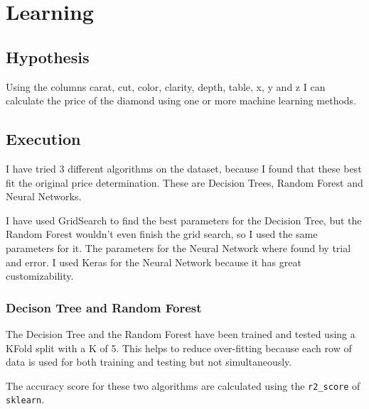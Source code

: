 \documentclass{scrreprt}
\begin{document}
	\chapter{Learning}
		\section{Hypothesis}
			Using the columns carat, cut, color, clarity, depth, table, x, y and z I can calculate the price of the diamond using one or more machine learning methods.\par
		\section{Execution}
			I have tried 3 different algorithms on the dataset, because I found that these best fit the original price determination. These are Decision Trees, Random Forest and Neural Networks. \par
			I have used GridSearch to find the best parameters for the Decision Tree, but the Random Forest wouldn't even finish the grid search, so I used the same parameters for it. The parameters for the Neural Network where found by trial and error. I used Keras for the Neural Network because it has great customizability.\par
			\subsection{Decison Tree and Random Forest}
				The Decision Tree and the Random Forest have been trained and tested using a KFold split with a K of 5. This helps to reduce over-fitting because each row of data is used for both training and testing but not simultaneously.\par
				The accuracy score for these two algorithms are calculated using the \texttt{r2\_score} of \texttt{sklearn}.\par
			\newpage
\end{document}
